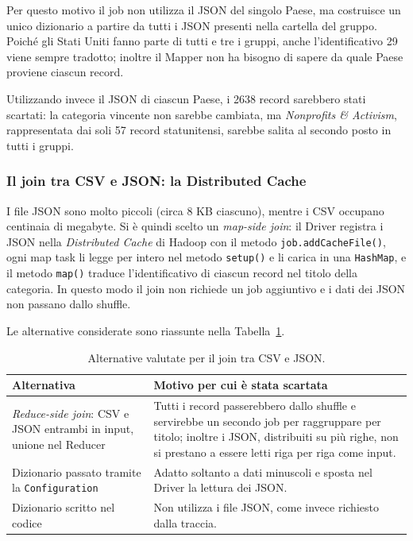 \documentclass[12pt, a4paper]{article}
\begin{document}
Per questo motivo il job non utilizza il JSON del singolo
Paese, ma costruisce un unico dizionario a partire da tutti
i JSON presenti nella cartella del gruppo.
Poiché gli Stati Uniti fanno parte di tutti e tre i gruppi,
anche l'identificativo 29 viene sempre tradotto; inoltre
il Mapper non ha bisogno di sapere da quale Paese
proviene ciascun record.

Utilizzando invece il JSON di ciascun Paese, i 2638 record
sarebbero stati scartati: la categoria vincente non
sarebbe cambiata, ma \textit{Nonprofits \& Activism},
rappresentata dai soli 57 record statunitensi,
sarebbe salita al secondo posto in tutti i gruppi.

\subsubsection{Il join tra CSV e JSON: la Distributed Cache}

I file JSON sono molto piccoli (circa 8 KB ciascuno),
mentre i CSV occupano centinaia di megabyte.
Si è quindi scelto un \textit{map-side join}: il Driver
registra i JSON nella \textit{Distributed Cache} di Hadoop
con il metodo \texttt{job.addCacheFile()}, ogni map task
li legge per intero nel metodo \texttt{setup()} e li carica
in una \texttt{HashMap}, e il metodo \texttt{map()}
traduce l'identificativo di ciascun record nel titolo
della categoria. In questo modo il join non richiede
un job aggiuntivo e i dati dei JSON non passano dallo shuffle.

Le alternative considerate sono riassunte
nella Tabella~\ref{tab:job3alternative}.

\begin{table}[H]
\centering
\small
\begin{tabular}{|p{}|p{}|}
\hline
\textbf{Alternativa} & \textbf{Motivo per cui è stata scartata} \\
\hline
\textit{Reduce-side join}: CSV e JSON entrambi in input,
unione nel Reducer &
Tutti i record passerebbero dallo shuffle e servirebbe
un secondo job per raggruppare per titolo; inoltre i JSON,
distribuiti su più righe, non si prestano a essere
letti riga per riga come input. \\
\hline
Dizionario passato tramite la \texttt{Configuration} &
Adatto soltanto a dati minuscoli e sposta nel Driver
la lettura dei JSON. \\
\hline
Dizionario scritto nel codice &
Non utilizza i file JSON, come invece richiesto
dalla traccia. \\
\hline
\end{tabular}
\caption{Alternative valutate per il join tra CSV e JSON.}
\label{tab:job3alternative}
\end{table}
\end{document}
